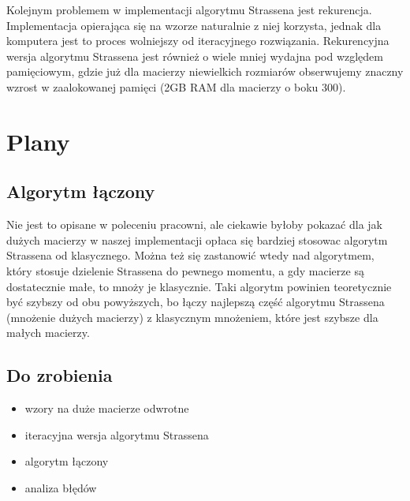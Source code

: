 \documentclass[paper=a4, fontsize=11pt]{scrartcl} %
\numberwithin{equation}{section} %
\numberwithin{figure}{section} %
\numberwithin{table}{section} %
\begin{document}
Kolejnym problemem w implementacji algorytmu Strassena jest rekurencja.
Implementacja opierająca się na wzorze naturalnie z niej korzysta, jednak dla komputera
jest to proces wolniejszy od iteracyjnego rozwiązania. Rekurencyjna wersja algorytmu 
Strassena jest również o wiele mniej wydajna pod względem pamięciowym, gdzie już dla macierzy niewielkich rozmiarów obserwujemy znaczny wzrost w zaalokowanej pamięci 
(2GB RAM dla macierzy o boku 300).

\section{Plany}

\subsection{Algorytm łączony}
Nie jest to opisane w poleceniu pracowni, ale ciekawie byłoby pokazać dla jak dużych macierzy w naszej implementacji opłaca się bardziej stosowac algorytm Strassena od klasycznego. Można też się zastanowić wtedy nad algorytmem, który stosuje dzielenie Strassena do pewnego momentu, a gdy macierze są dostatecznie małe, to mnoży je klasycznie.
Taki algorytm powinien teoretycznie być szybszy od obu powyższych, bo łączy najlepszą część algorytmu Strassena (mnożenie dużych macierzy) z klasycznym mnożeniem, 
które jest szybsze dla małych macierzy.

\subsection{Do zrobienia}

\begin{itemize}
  \item wzory na duże macierze odwrotne
  \item iteracyjna wersja algorytmu Strassena
  \item algorytm łączony
  \item analiza błędów
\end{itemize}
\end{document}
